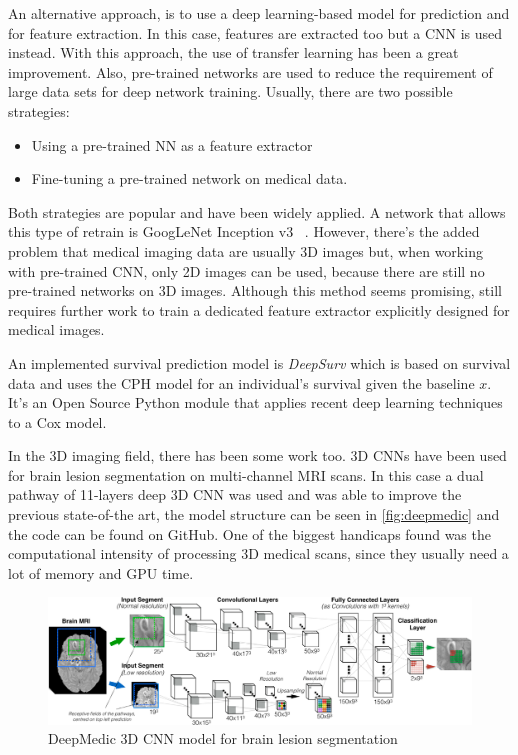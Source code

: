 An alternative approach, is to use a deep learning-based model for prediction and for feature
extraction. In this case, features are extracted too but a \gls{CNN} 
is used instead. With this approach, the use of transfer learning has been a
great improvement. Also, pre-trained networks are used to reduce the requirement of large data
sets for deep network training. Usually, there are two possible strategies: 
\begin{itemize}
  \item Using a pre-trained NN as a feature extractor
  \item Fine-tuning a pre-trained network on medical data.
\end{itemize}

Both strategies are popular and have been widely applied. A network that allows this type
of retrain is GoogLeNet Inception v3
~\cite{neural:goog-le-net, neural:retrain, neural:inception-retrain}.
However, there's the added problem that medical imaging data are usually 3D images but, 
when working with pre-trained \gls{CNN}, only 2D images can be used, because there are still no 
pre-trained networks on 3D images. Although this method seems promising, still requires 
further work to train a dedicated feature extractor explicitly designed for medical images.
~\cite{medical:deep-learning-radiomics-gbm}

An implemented survival prediction model is \emph{DeepSurv} which is based on survival data
and uses the \gls{CPH} model for an individual's survival given the \gls{baseline}
\( x \). It's an Open Source Python module that applies recent deep learning techniques 
to a Cox model.
~\cite{medical:deep-surv, medical:cox}

In the 3D imaging field, there has been some work too. 3D \glspl{CNN} have
been used for brain lesion segmentation on multi-channel \gls{MRI} scans. In this case a 
dual pathway of 11-layers deep 3D \gls{CNN} was used and was able to improve the previous
state-of-the art, the model structure can be seen in \autoref{fig:deepmedic} and the code 
can be found on GitHub. 
One of the biggest handicaps found was the computational intensity of
processing 3D medical scans, since they usually need a lot of memory and GPU time.
~\cite{neural:deepmedic, neural:3d-cnn-crf}

\begin{figure}
  \centering
  \includegraphics[width=\textwidth]{images/deepmedic}

  \caption[DeepMedic 3D CNN model]{
    DeepMedic 3D \acrshort{CNN} model for brain lesion segmentation \cite{neural:3d-cnn-crf}
    \label{fig:deepmedic}
  }
\end{figure}

